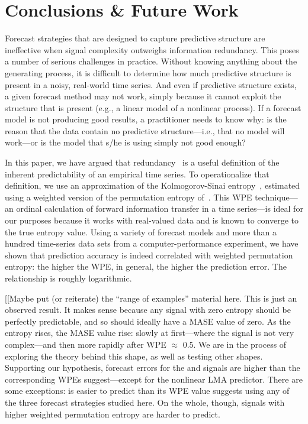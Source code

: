 \section{ Conclusions \& Future Work }\label{sec:conc}

Forecast strategies that are designed to capture predictive structure
are ineffective when signal complexity outweighs information
redundancy.  This poses a number of serious challenges in practice.
Without knowing anything about the generating process, it is difficult
to determine how much predictive structure is present in a noisy,
real-world time series.  And even if predictive structure exists, a
given forecast method may not work, simply because it cannot exploit
the structure that is present (e.g., a linear model of a nonlinear
process).  If a forecast model is not producing good results, a
practitioner needs to know why: is the reason that the data contain no
predictive structure---i.e., that no model will work---or is the model
that s/he is using simply not good enough?

In this paper, we have argued that redundancy~\cite{crutchfield2003}
is a useful definition of the inherent predictability of an empirical
time series.  To operationalize that definition, we use an
approximation of the Kolmogorov-Sinai entropy~\cite{lind95}, estimated
using a weighted version of the permutation entropy
of~\cite{bandt2002per}.  This WPE technique---an ordinal calculation
of forward information transfer in a time series---is ideal for our
purposes because it works with real-valued data and is known to
converge to the true entropy value. Using a variety of forecast models
and more than a hundred time-series data sets from a
computer-performance experiment, we have shown that prediction
accuracy is indeed correlated with weighted permutation entropy: the
higher the WPE, in general, the higher the prediction error.  The
relationship is roughly logarithmic.  

[[Maybe put (or reiterate) the ``range of examples'' material here.
    This is just an observed result.  It makes sense because any
    signal with zero entropy should be perfectly predictable, and so
    should ideally have a MASE value of zero.  As the entropy rises,
    the MASE value rise: slowly at first---where the signal is not
    very complex---and then more rapidly after WPE $\approx$ 0.5.  We
    are in the process of exploring the theory behind this shape, as
    well as testing other shapes.  Supporting our hypothesis, forecast
    errors for the \col and \svdfive signals are higher than the
    corresponding WPEs suggest---except for the nonlinear LMA
    predictor.  There are some exceptions: \svdone is easier to
    predict than its WPE value suggests using any of the three
    forecast strategies studied here.  On the whole, though, signals
    with higher weighted permutation entropy are harder to predict.

